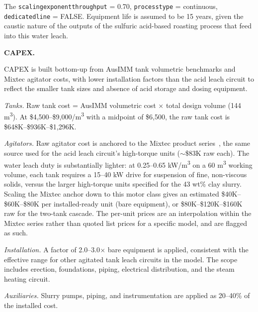 \documentclass{article}
\renewcommand\_{\textunderscore\allowbreak}
\begin{document}
The \texttt{scaling\_exponent\_throughput} = 0.70, \texttt{process\_type} = continuous, \texttt{dedicated\_line} = FALSE. Equipment life is assumed to be 15 years, given the caustic nature of the outputs of the sulfuric acid-based roasting process that feed into this water leach. 

\medskip
\noindent\textbf{CAPEX.}\quad

CAPEX is built bottom-up from AusIMM tank volumetric benchmarks and Mixtec agitator costs, with lower installation factors than the acid leach circuit to reflect the smaller tank sizes and absence of acid storage and dosing equipment.

\textit{Tanks.} Raw tank cost = AusIMM volumetric cost $\times$ total design volume (144 \si{m^3}). At \$4,500--\$9,000/\si{m^3} with a midpoint of \$6,500, the raw tank cost is \$648K--\$936K--\$1,296K.

\textit{Agitators.} Raw agitator cost is anchored to the Mixtec product series~\citep{baguleyMixtechAustraliaFluid2009}, the same source used for the acid leach circuit's high-torque units ($\sim$\$83K raw each). The water leach duty is substantially lighter: at 0.25--0.65 \si{kW/m^3} on a 60 \si{m^3} working volume, each tank requires a 15--40 kW drive for suspension of fine, non-viscous solids, versus the larger high-torque units specified for the 43 wt\% clay slurry. Scaling the Mixtec anchor down to this motor class gives an estimated \$40K--\$60K--\$80K per installed-ready unit (bare equipment), or \$80K--\$120K--\$160K raw for the two-tank cascade. The per-unit prices are an interpolation within the Mixtec series rather than quoted list prices for a specific model, and are flagged as such.

\textit{Installation.} A factor of 2.0--3.0$\times$ bare equipment is applied, consistent with the effective range for other agitated tank leach circuits in the model. The scope includes erection, foundations, piping, electrical distribution, and the steam heating circuit.

\textit{Auxiliaries.} Slurry pumps, piping, and instrumentation are applied as 20--40\% of the installed cost.
\end{document}
